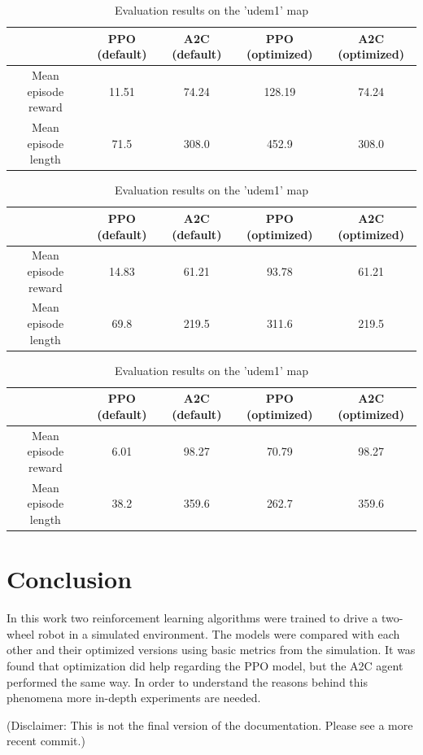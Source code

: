 \documentclass{article}
\begin{document}
\begin{table}[H]
	\caption{Evaluation results on the 'zigzag\_dists' map}
	\begin{center}
	\begin{tabular}{c c c c c}
	  & PPO (default) & A2C (default) & PPO (optimized) & A2C (optimized) \\
	\hline
	Mean episode reward & 11.51 & 74.24 & 128.19 & 74.24 \\
	\hline
	Mean episode length & 71.5 & 308.0 & 452.9& 308.0 \\
	\hline
	\end{tabular}
	\end{center}
	\label{t:zigzagdists}

	\caption{Evaluation results on the 'small\_loop' map}
	\begin{center}
	\begin{tabular}{c c c c c}
	  & PPO (default) & A2C (default) & PPO (optimized) & A2C (optimized) \\
	\hline
	Mean episode reward & 14.83 & 61.21 & 93.78 & 61.21 \\
	\hline
	Mean episode length & 69.8 & 219.5 & 311.6 & 219.5 \\
	\hline
	\end{tabular}
	\end{center}
	\label{t:smalloop}

	\caption{Evaluation results on the 'udem1' map}
	\begin{center}
	\begin{tabular}{c c c c c}
	  & PPO (default) & A2C (default) & PPO (optimized) & A2C (optimized) \\
	\hline
	Mean episode reward & 6.01 & 98.27 & 70.79 & 98.27 \\
	\hline
	Mean episode length & 38.2 & 359.6 & 262.7 & 359.6 \\
	\hline
	\end{tabular}
	\end{center}
	\label{t:udem1}
\end{table}

\section{\large{Conclusion}}
In this work two reinforcement learning algorithms were trained to drive a two-wheel robot in a simulated environment. The models were compared with each other and their optimized versions using basic metrics from the simulation. It was found that optimization did help regarding the PPO model, but the A2C agent performed the same way. In order to understand the reasons behind this phenomena more in-depth experiments are needed.

(Disclaimer: This is not the final version of the documentation. Please see a more recent commit.)


%

%
\end{document}
